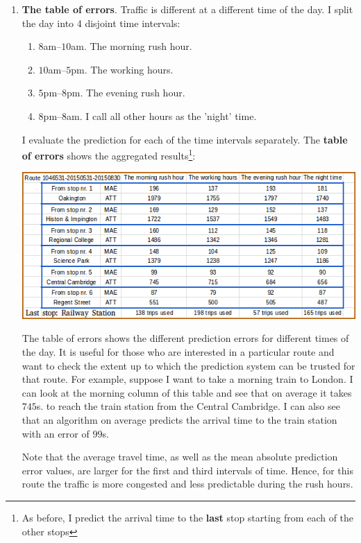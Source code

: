 \documentclass[12pt,a4paper,oneside,openright]{report}
\begin{document}
\begin{enumerate}

\item[(iii)] \textbf{The table of errors}. Traffic is different at a different time of
the day. I split the day into 4 disjoint time intervals:

\begin{enumerate}
\item[1.] $8$am--$10$am. The morning rush hour.
\item[2.] $10$am--$5$pm. The working hours.
\item[2.] $5$pm--$8$pm. The evening rush hour.
\item[3.] $8$pm--$8$am. I call all other hours as the 'night' time.



\end{enumerate}

I evaluate the prediction for each of the time intervals separately. The 
\textbf{table of errors} shows the aggregated results\footnote{As before,
I predict the arrival time to the \textbf{last} stop starting from each of the
other stops}:

\includegraphics[width=\textwidth]{figs/table_of_times.png}

The table of errors shows the different prediction errors for different
times of the day. It is useful for those who are interested in a
particular route and want to check the extent up to which the prediction system 
can be trusted for that route. For example, suppose I want to take a morning train
to London. I can look at the morning column of this table and see that on average
it takes $745$s. to reach the train station from the Central Cambridge. I can
also see that an algorithm on average predicts the arrival time to the train station
with an error of $99$s.

Note that the average travel time, as well as the mean absolute
prediction error values, are larger for the first and third intervals of time.
Hence, for this route the traffic is more congested and less predictable
during the rush hours.

\end{enumerate}
\end{document}
